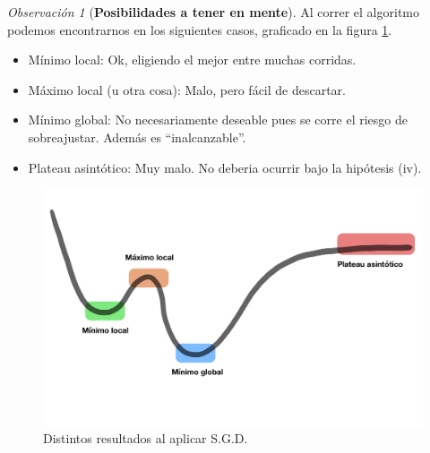 \documentclass[letterpaper,11pt]{article} %
\theoremstyle{defbreak}
\theoremstyle{propbreak}
\theoremstyle{remark}
\newtheorem{remark}{Observación}[subsection]
\theoremstyle{break}
\begin{document}
\begin{remark}[\textbf{Posibilidades a tener en mente}]
Al correr el algoritmo podemos encontrarnos en los siguientes casos, graficado en la figura \ref{fig:sgd}.
\begin{itemize}
    \item Mínimo local: Ok, eligiendo el mejor entre muchas corridas.
    \item Máximo local (u otra cosa): Malo, pero fácil de descartar.
    \item Mínimo global: No necesariamente deseable pues se corre el riesgo de sobreajustar. Además es ``inalcanzable''.
    \item Plateau asintótico: Muy malo. No deberia ocurrir bajo la hipótesis (iv).
\end{itemize}
\end{remark}
\begin{figure}
    \centering
    \includegraphics[scale=0.16]{img/Clase_18_pag_09.jpg}
    \caption{Distintos resultados al aplicar S.G.D.}
    \label{fig:sgd}
\end{figure}
\end{document}
